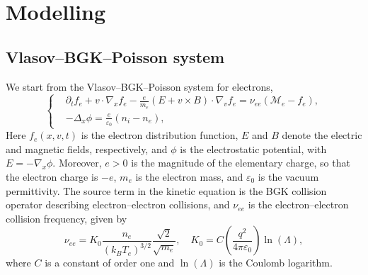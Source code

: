 \documentclass[pdflatex,final,10pt]{article}
\newcommand{\Del}[1]{#1}
\begin{document}

\section{Modelling}
\subsection{Vlasov--BGK--Poisson system}
We start from the Vlasov--BGK--Poisson system for electrons,
\begin{equation} \label{1}
    \left \{
    \begin{aligned}
        &\partial_t{f_e} + v\cdot \nabla_x{f_e}-\frac{e}{m_e}(E+v \times B) \cdot \nabla_v{f_e}=\Del{\nu_{ee}(\mathcal{M}_{e}-f_e)},\\
        &-\Delta_{x}\phi=\frac{e}{\varepsilon_{0}}(n_{i}-n_e),
    \end{aligned}
    \right.
\end{equation}
Here $f_e(x,v,t)$ is the electron distribution function, $E$ and $B$ denote the electric and magnetic fields, respectively, and $\phi$ is the electrostatic potential, with $E=-\nabla_x\phi$. Moreover, $e>0$ is the magnitude of the elementary charge, so that the electron charge is $-e$, $m_e$ is the electron mass, and $\varepsilon_0$ is the vacuum permittivity. The \Del{source term in the kinetic equation} is the BGK collision operator describing electron--electron collisions, and $\nu_{ee}$ is the electron--electron collision frequency, given by
\begin{equation*}
    \nu_{ee} = K_0 \frac{n_{e}}{(k_{B}T_{e})^{3/2}} \frac{\sqrt{2}}{\sqrt{m_{e}}}, \quad 
    K_0 = C \left( \frac{q^2}{4\pi\varepsilon_0} \right) \ln(\Lambda),
\end{equation*}
where $C$ is a constant of order one and $\ln(\Lambda)$ is the Coulomb logarithm.
\end{document}
